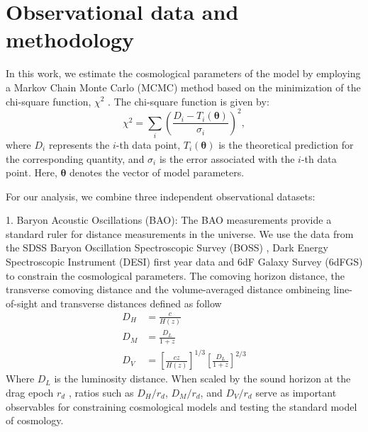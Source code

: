 \documentclass[a4paper,fleqn]{cas-sc}
\begin{document}

\section{Observational data and methodology}\label{sec:data}

In this work, we estimate the cosmological parameters of the model by employing a Markov Chain Monte Carlo (MCMC) method based on the minimization of the chi-square function, \(\chi^2\) \cite{Padilla_2021}. The chi-square function is given by:
\begin{equation}
\chi^2 = \sum_i \left(\frac{D_i - T_i(\mathbf{\theta})}{\sigma_i}\right)^2,
\end{equation}
where \(D_i\) represents the \(i\)-th data point, \(T_i(\mathbf{\theta})\) is the theoretical prediction for the corresponding quantity, and \(\sigma_i\) is the error associated with the \(i\)-th data point. Here, \(\mathbf{\theta}\) denotes the vector of model parameters.

For our analysis, we combine three independent observational datasets:

1. Baryon Acoustic Oscillations (BAO): The BAO measurements provide a standard ruler for distance measurements in the universe. We use the data from the SDSS Baryon Oscillation Spectroscopic Survey (BOSS) , Dark Energy Spectroscopic Instrument (DESI) first year data and 6dF Galaxy Survey (6dFGS) to constrain the cosmological parameters. The comoving horizon distance, the transverse comoving distance
and the volume-averaged distance ombineing line-of-sight and transverse distances defined as follow
\begin{align}
    D_H&=\frac{c}{H(z)} \\
    D_M&=\frac{D_L}{1+z}\\
    D_V&=\left[\frac{cz}{H(z)}\right]^{1/3}\left[\frac{D_L}{1+z}\right]^{2/3}
\end{align}
Where $D_L$ is the luminosity distance. When scaled by the sound horizon at the drag epoch \(r_d\) , ratios such as \(D_H/r_d\), \(D_M/r_d\), and \(D_V/r_d\) serve as important observables for constraining cosmological models and testing the standard model of cosmology.
\end{document}
